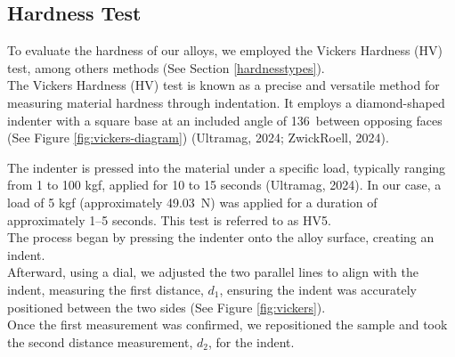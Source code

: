 \documentclass{article}
\begin{document}
\subsection{Hardness Test}
To evaluate the hardness of our alloys, we employed the Vickers Hardness (HV) test, among others methods (See Section \ref{hardnesstypes}).\\[8pt]
The Vickers Hardness (HV) test is known as a precise and versatile method for measuring material hardness through indentation. It employs a diamond-shaped indenter with a square base at an included angle of 136\textdegree \ between opposing faces (See Figure \ref{fig:vickers-diagram}) (Ultramag, 2024; ZwickRoell, 2024).\\[8pt]
\begin{minipage}{0.55\textwidth}
    The indenter is pressed into the material under a specific load, typically ranging from 1 to 100 kgf\footnotemark, applied for 10 to 15 seconds (Ultramag, 2024). In our case, a load of 5 kgf (approximately \SI{49.03}{\newton}) was applied for a duration of approximately 1–5 seconds. This test is referred to as HV5.\\[8pt]
    The process began by pressing the indenter onto the alloy surface, creating an indent.\\[8pt] 
    Afterward, using a dial, we adjusted the two parallel lines to align with the indent, measuring the first distance, \(d_1\), ensuring the indent was accurately positioned between the two sides (See Figure \ref{fig:vickers}).\\[8pt]
    Once the first measurement was confirmed, we repositioned the sample and took the second distance measurement, \(d_2\), for the indent.
\end{minipage}\hspace{1em}
\end{document}
